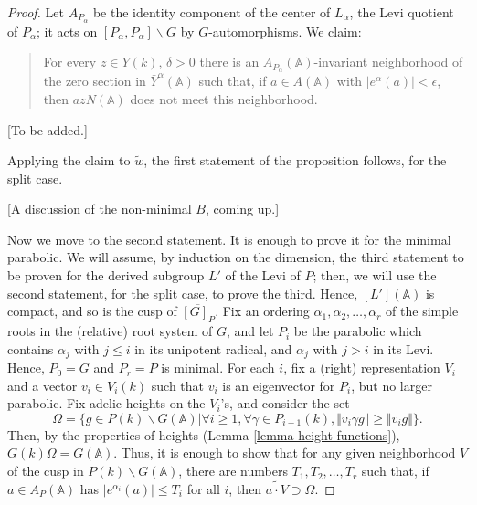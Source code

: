 \begin{proof}
Let $A_{P_\alpha}$ be the identity component of the center of $L_\alpha$, the Levi quotient of $P_\alpha$; it acts on $[P_\alpha,P_\alpha]\backslash G$ by $G$-automorphisms. 
We claim:

\begin{quote}
 \item For every $z\in Y(k)$, $\delta>0$ there is an $A_{P_\alpha}(\mathbb A)$-invariant neighborhood of the zero section in $\bar Y^\alpha(\mathbb A)$ such that, if $a\in A(\mathbb A)$ with $|e^\alpha(a)|<\epsilon$, then $a z N(\mathbb A)$ does not meet this neighborhood. 
\end{quote}

[To be added.]

Applying the claim to $\tilde w$, the first statement of the proposition follows, for the split case.

 
[A discussion of the non-minimal $B$, coming up.]
 
 
 Now we move to the second statement. It is enough to prove it for the minimal parabolic. We will assume, by induction on the dimension, the third statement to be proven for the derived subgroup $L'$ of the Levi of $P$; then, we will use the second statement, for the split case, to prove the third. Hence, $[L'](\mathbb A)$ is compact, and so is the cusp of $\overline{[G]_P}$. Fix an ordering $\alpha_1, \alpha_2, \dots,\alpha_r$ of the simple roots in the (relative) root system of $G$, and let $P_i$ be the parabolic which contains $\alpha_j$ with $j\le i$ in its unipotent radical, and $\alpha_j$ with $j>i$ in its Levi. Hence, $P_0=G$ and $P_r=P$ is minimal. For each $i$, fix a (right) representation $V_i$ and a vector $v_i \in V_i(k)$ such that $v_i$ is an eigenvector for $P_i$, but no larger parabolic. Fix adelic heights on the $V_i$'s, and consider the set 
 $$ \Omega = \{g \in P(k)\backslash G(\mathbb A) | \forall i \ge 1, \forall \gamma \in P_{i-1}(k), \Vert v_i \gamma g \Vert \ge \Vert  v_i g\Vert\}.$$
 Then, by the properties of heights (Lemma \ref{lemma-height-functions}), $G(k)\Omega = G(\mathbb A)$. Thus, it is enough to show that for any given neighborhood $V$ of the cusp in $P(k)\backslash G(\mathbb A)$, there are numbers $T_1, T_2, \dots, T_r$ such that, if $a\in A_P(\mathbb A)$ has $|e^{\alpha_i}(a)|\le T_i$ for all $i$, then $\widetilde{a\cdot V} \supset \Omega$.
 

\end{proof}
